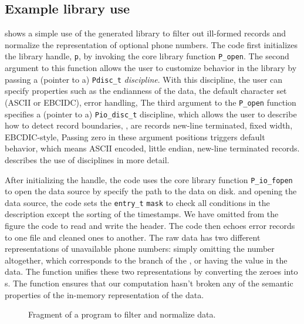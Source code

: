 \subsection{Example library use}
\label{sec:example:library-use}
 shows a simple use of 
the generated \dibbler{} library to filter out ill-formed records and normalize the representation of optional phone numbers. 
The code first initializes the \pads{} library handle, \texttt{p}, by invoking the core library function \texttt{P\_open}.  The second argument to this function allows the user to customize behavior in the \pads{} library by passing a (pointer to a) \texttt{Pdisc\_t} \textit{discipline}. With this discipline, the user can specify properties such as the endianness of the data, the default character set (ASCII or EBCIDC), error handling, \etc{}  The third argument to the \texttt{P\_open} function specifies a (pointer to a) \texttt{Pio\_disc\_t} discipline, which allows the user to describe how to detect record boundaries, \ie{}, are records new-line terminated, fixed width, EBCDIC-style, \etc{} 
Passing zero in these argument positions triggers default behavior, which 
means ASCII encoded, little endian, new-line terminated records.
 describes the use of disciplines in more detail. 

After initializing the \pads{} handle, the code uses the core library function \texttt{P\_io\_fopen} to open the data source by specify the path to the data on disk.  
 and opening the data source, the code sets
the \texttt{entry\_t} \texttt{mask} to check all conditions in the \dibbler{} description except the
sorting of the timestamps.  We have omitted from the figure the code to read and write the header. 
The code then echoes error records to one file and cleaned ones to another.
The raw data has two different representations of unavailable phone numbers:
simply omitting the number altogether, which corresponds to the 
branch of the , or having the value  in the data.  
The function  unifies these two representations 
by converting the zeroes into s.  The function 
ensures that our computation hasn't broken any of the semantic properties
of the in-memory representation of the data.


\begin{figure*}

\caption{Fragment of a program to filter and normalize \dibbler{} data.}
\label{figure:sirius-filter}
\end{figure*}

























